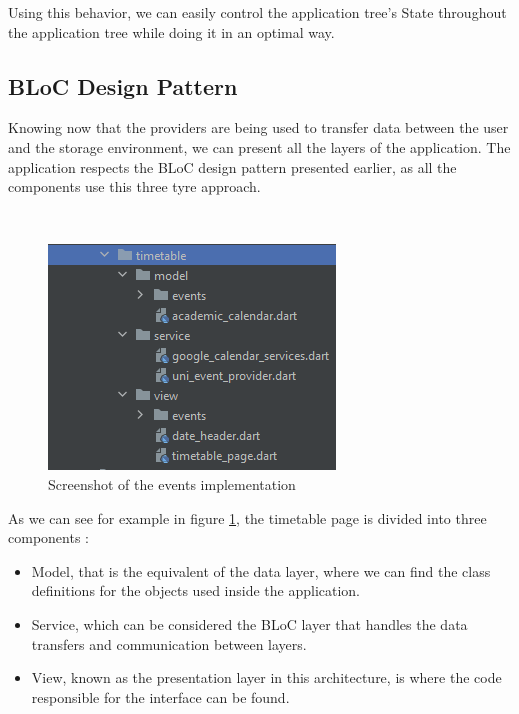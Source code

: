 Using this behavior, we can easily control the application tree’s State throughout the application tree while doing it in an optimal way.

\subsection{BLoC Design Pattern} \label{4:app:bloc}
 Knowing now that the providers are being used to transfer data between the user and the storage environment, we can present all the layers of the application. 
The application respects the BLoC design pattern presented earlier, as all the components use this three tyre approach.

~

\begin{figure}
            \centering
            \includegraphics[width=0.5\columnwidth]{figures/c4/image5.png}
            \captionsetup{labelsep=space, textformat=empty}
            \caption{Screenshot of the events implementation}
            \label{4:bloc}
        \end{figure}
As we can see for example in figure \ref{4:bloc}, the timetable page is divided into three components :


\begin{itemize}
            \setlength{\topsep}{0.5pt}
            \setlength{\itemsep}{0.5pt}
            \setlength{\parsep}{0.5pt}
            \item Model, that is the equivalent of the data layer, where we can find the class definitions for the objects used inside the application. 
           \item Service, which can be considered the BLoC layer that handles the data transfers and communication between layers. 
            \item View, known as the presentation layer in this architecture, is where the code responsible for the interface can be found.
        \end{itemize}
        
